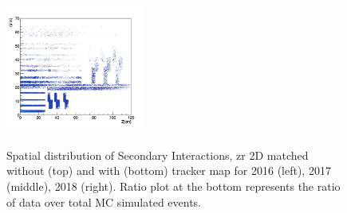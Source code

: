 \documentclass{cernatlasnote}
\begin{document}
\begin{figure}[htp]
 \includegraphics[width=4.6cm, height=4.4cm]{images/emu_channel/2018/18_2D_plots/SecInt_z_r_tracker_match.png}\\
 \caption{Spatial distribution of Secondary Interactions, zr 2D matched without (top) and with (bottom) tracker map for 2016 (left), 2017 (middle), 2018 (right). Ratio plot at the bottom represents the ratio of data over total MC simulated events.}
 \label{fig:L0DATAMC}
  \end{figure}
\end{document}
